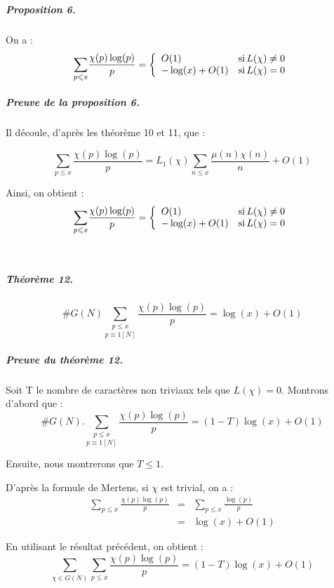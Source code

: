 \

\subparagraph{Proposition 6.}

On a :
\[ \underset{p \leqslant x}{\sum} \frac{\chi (p) \log (p)}{p} =
   \left\{\begin{array}{ll}
     O (1) & \operatorname{si} L (\chi) \neq 0\\
     - \log (x) + O (1) & \operatorname{si} L (\chi) = 0
   \end{array}\right. \]


\subparagraph{Preuve de la proposition 6.}

Il d{\'e}coule, d'apr{\`e}s les th{\'e}or{\`e}me 10 et 11, que :


\[ \underset{p \leqslant x}{\sum} \frac{\chi (p) \log (p)}{p} = L_1 (\chi)
   \underset{n \leqslant x}{\sum} \frac{\mu (n) \chi (n)}{n} + O (1) \]


Ainsi, on obtient :
\[ \underset{p \leqslant x}{\sum} \frac{\chi (p) \log (p)}{p} =
   \left\{\begin{array}{ll}
     O (1) & \operatorname{si} L (\chi) \neq 0\\
     - \log (x) + O (1) & \operatorname{si} L (\chi) = 0
   \end{array}\right. \]


\

\subparagraph{Th{\'e}or{\`e}me 12.}

\[ \#G (N) \underset{p \equiv 1 [N]}{\underset{p \leqslant x}{\sum}}
   \frac{\chi (p) \log (p)}{p} = \log (x) + O (1) \]


\subparagraph{Preuve du th{\'e}or{\`e}me 12.}

Soit T le nombre de caract{\`e}res non triviaux tels que $L (\chi) = 0$.
Montrons d'abord que :
\[ \#G (N) . \underset{p \equiv 1 [N]}{\underset{p \leqslant x}{\sum}}
   \frac{\chi (p) \log (p)}{p} = (1 - T) \log (x) + O (1) \]


Ensuite, nous montrerons que $T \leqslant 1$.

D'apr{\`e}s la formule de Mertens, si $\chi$ est trivial, on a :
\begin{eqnarray*}
  \underset{p \leqslant x}{\sum} \frac{\chi (p) \log (p)}{p} & = & \underset{p
  \leqslant x}{\sum} \frac{\log (p)}{p}\\
  & = & \log (x) + O (1)
\end{eqnarray*}


En utilisant le r{\'e}sultat pr{\'e}c{\'e}dent, on obtient :
\[ \underset{\chi \in G (N)}{\sum} \underset{p \leqslant x}{\sum} \frac{\chi
   (p) \log (p)}{p} = (1 - T) \log (x) + O (1) \]



